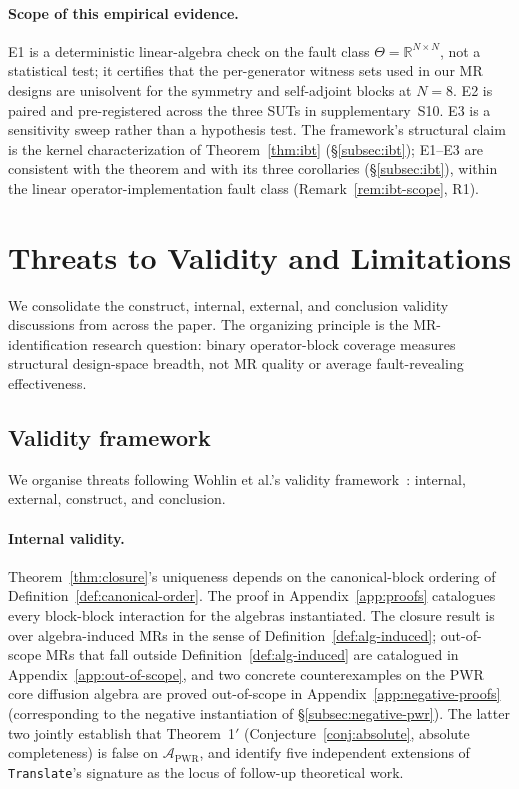 \documentclass[manuscript]{acmart}
\begin{document}
\paragraph{Scope of this empirical evidence.}
E1 is a deterministic linear-algebra check on the fault class $\Theta = \mathbb{R}^{N \times N}$, not a statistical test; it certifies that the per-generator witness sets used in our MR designs are unisolvent for the symmetry and self-adjoint blocks at $N = 8$. E2 is paired and pre-registered across the three SUTs in supplementary~S10. E3 is a sensitivity sweep rather than a hypothesis test. The framework's structural claim is the kernel characterization of Theorem~\ref{thm:ibt} (\S\ref{subsec:ibt}); E1--E3 are consistent with the theorem and with its three corollaries (\S\ref{subsec:ibt}), within the linear operator-implementation fault class (Remark~\ref{rem:ibt-scope}, R1).


\section{Threats to Validity and Limitations}
\label{sec:threats-limitations}

We consolidate the construct, internal, external, and conclusion validity discussions from across the paper. The organizing principle is the MR-identification research question: binary operator-block coverage measures structural design-space breadth, not MR quality or average fault-revealing effectiveness.

\subsection{Validity framework}

We organise threats following Wohlin et al.'s validity framework~\cite{Wohlin2012EmpiricalSE}: internal, external, construct, and conclusion.

\paragraph{Internal validity.} Theorem~\ref{thm:closure}'s uniqueness depends on the canonical-block ordering of Definition~\ref{def:canonical-order}. The proof in Appendix~\ref{app:proofs} catalogues every block-block interaction for the algebras instantiated. The closure result is over algebra-induced MRs in the sense of Definition~\ref{def:alg-induced}; out-of-scope MRs that fall outside Definition~\ref{def:alg-induced} are catalogued in Appendix~\ref{app:out-of-scope}, and two concrete counterexamples on the PWR core diffusion algebra are proved out-of-scope in Appendix~\ref{app:negative-proofs} (corresponding to the negative instantiation of \S\ref{subsec:negative-pwr}). The latter two jointly establish that Theorem~1$'$ (Conjecture~\ref{conj:absolute}, absolute completeness) is false on $\mathcal{A}_{\mathrm{PWR}}$, and identify five independent extensions of \texttt{Translate}'s signature as the locus of follow-up theoretical work.
\end{document}

